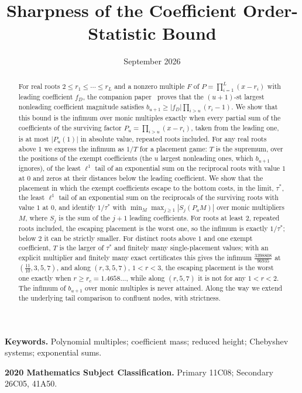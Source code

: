 \documentclass[11pt]{article}
\title{Sharpness of the Coefficient Order-Statistic Bound}
\author{\shortstack{Bangyen Pham\\
\small Independent Researcher\\
\small\href{mailto:bangyenp@gmail.com}{\texttt{bangyenp@gmail.com}}\\
\small\href{https://orcid.org/0009-0006-9928-2088}{ORCID: 0009-0006-9928-2088}}}
\date{September 2026}
\theoremstyle{definition}
\theoremstyle{plain}
\begin{document}
\maketitle

\begin{abstract}
For real roots $2\le r_1\le\cdots\le r_L$ and a nonzero multiple $F$ of
$P=\prod_{i=1}^L(x-r_i)$ with leading coefficient $f_D$, the companion
paper~\cite{coefficient-mass} proves that the $(u+1)$-st largest nonleading
coefficient magnitude satisfies $b_{u+1}\ge|f_D|\prod_{i>u}(r_i-1)$.  We show
that this bound is the infimum over monic multiples exactly when every
partial sum of the coefficients of the surviving factor
$P_u=\prod_{i>u}(x-r_i)$, taken from the leading one, is at most $|P_u(1)|$
in absolute value, repeated roots included.  For any real roots above $1$ we
express the infimum as $1/T$ for a placement game: $T$ is the supremum, over
the positions of the exempt coefficients (the $u$ largest nonleading ones,
which $b_{u+1}$ ignores), of the least $\ell^1$ tail of an exponential sum
on the reciprocal roots with value $1$ at $0$ and zeros at their distances
below the leading coefficient.  We show that the placement in which the exempt coefficients escape to the
bottom costs, in the limit, $\tau^*$, the least $\ell^1$ tail of an exponential sum on the
reciprocals of the surviving roots with value $1$ at $0$, and identify
$1/\tau^*$ with $\min_M\max_{j\ge1}|S_j(P_uM)|$ over monic multipliers $M$,
where $S_j$ is the sum of the $j+1$ leading coefficients.  For roots at least $2$, repeated roots
included, the escaping placement is the worst one, so the infimum is exactly
$1/\tau^*$; below $2$ it can be strictly smaller.  For distinct roots
above $1$ and one exempt coefficient, $T$ is the larger of $\tau^*$ and
finitely many single-placement values; with an explicit multiplier and
finitely many exact certificates this gives the infimum
$\tfrac{3398808}{96935}$ at $(\tfrac{11}{10},3,5,7)$, and along
$(r,3,5,7)$, $1<r<3$, the escaping placement is the worst one exactly when
$r\ge r_c=1.4658\ldots$, while along $(r,5,7)$ it is not for any
$1<r<2$.  The infimum of $b_{u+1}$
over monic multiples is never attained.  Along the way we extend the underlying tail comparison to
confluent nodes, with strictness.
\end{abstract}

\noindent\textbf{Keywords.} Polynomial multiples; coefficient mass; reduced
height; Chebyshev systems; exponential sums.

\noindent\textbf{2020 Mathematics Subject Classification.} Primary 11C08; Secondary 26C05, 41A50.
\end{document}
